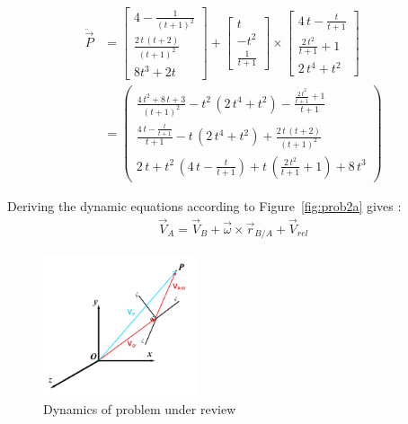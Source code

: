 \documentclass[conference]{IEEEtran}
\begin{document}
\begin{align*}
    \ddot{\vec{P}}   & =  \begin{bmatrix}
                              4-\frac{1}{(t+1)^2}                                 \\[10px]
                              \frac{2\,t\,\left(t+2\right)}{{\left(t+1\right)}^2} \\[10px]
                              8t^3+2t
                          \end{bmatrix} + \begin{bmatrix}
                                              t    \\[10px]
                                              -t^2 \\[10px]
                                              \frac{1}{t+1}
                                          \end{bmatrix} \times \begin{bmatrix}
                                                                   4\,t-\frac{t}{t+1}   \\[10px]
                                                                   \frac{2\,t^2}{t+1}+1 \\[10px]
                                                                   2\,t^4+t^2
                                                               \end{bmatrix}                                                                                     \\
                     & = \left(\begin{array}{c} \frac{4\,t^2+8\,t+3}{{\left(t+1\right)}^2}-t^2\,\left(2\,t^4+t^2\right)-\frac{\frac{2\,t^2}{t+1}+1}{t+1}  \\[10px]
                                       \frac{4\,t-\frac{t}{t+1}}{t+1}-t\,\left(2\,t^4+t^2\right)+\frac{2\,t\,\left(t+2\right)}{{\left(t+1\right)}^2} \\[10px]
                                       2\,t+t^2\,\left(4\,t-\frac{t}{t+1}\right)+t\,\left(\frac{2\,t^2}{t+1}+1\right)+8\,t^3\end{array}\right)
\end{align*}

Deriving the dynamic equations according to Figure~\ref{fig:prob2a} gives \cite{b5}:
\begin{gather}
    \vec{V}_A = \vec{V}_B + \vec{\omega} \times \vec{r}_{B/A} + \vec{V}_{rel} \label{eq:Vrel}
\end{gather}

\begin{figure}[htbp]
    \centerline{\includegraphics[width=0.4\textwidth]{figures/prob2b.png}}
    \caption{Dynamics of problem under review}
    \label{fig:prob2b}
\end{figure}
\end{document}
